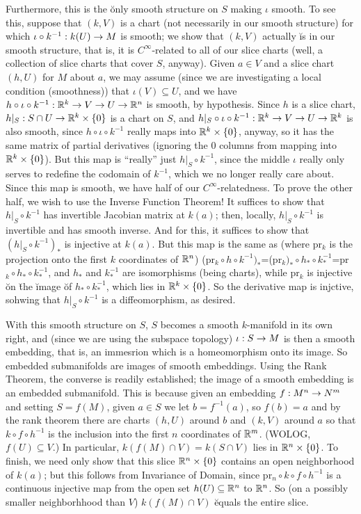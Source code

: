 Furthermore, this is the \u{only} smooth structure on $S$ making $\iota$ smooth. To see this, 
suppose that $(k,V)$ is a chart (not necessarily in our smooth structure) for which 
$\iota\circ k^{-1}: k(U)\rightarrow M$ is smooth; we show that $(k,V)$ actually \u{is} in our smooth
structure, that is, it is $C^\infty$-related to all of our slice charts (well, a collection of 
slice charts that cover $S$, anyway). Given $a\in V$ and 
a slice chart $(h,U)$ for $M$ about $a$, we may assume (since we are investigating a local condition (smoothness))
that $\iota(V)\subseteq U$, and we have 
$h\circ\iota\circ k^{-1}:{\Bbb R}^k\rightarrow V\rightarrow U\rightarrow {\Bbb R}^n$ is smooth, by hypothesis. Since $h$ is a slice chart,
$h|_S:S\cap U\rightarrow {\Bbb R}^k\times\{0\}$ is a chart on $S$, and $h|_S\circ\iota\circ k^{-1}:{\Bbb R}^k\rightarrow V\rightarrow U\rightarrow {\Bbb R}^k$
is also smooth, since $h\circ\iota\circ k^{-1}$ really maps into ${\Bbb R}^k\times\{0\}$, anyway, so it has the 
same matrix of partial derivatives (ignoring the $0$ columns from mapping into ${\Bbb R}^k\times\{0\}$).
But this map is ``really'' just $h|_S\circ k^{-1}$, since the middle $\iota$ really only serves to
redefine the codomain of $k^{-1}$, which we no longer really care about. Since this map is smooth,
we have half of our $C^\infty$-relatedness. To prove the other half, we wish to use the
Inverse Function Theorem! It suffices to show that $h|_S\circ k^{-1}$ has invertible Jacobian matrix
at $k(a)$; then, locally, $h|_S\circ k^{-1}$ is invertible and has smooth inverse. And for this, it suffices
to show that $(h|_S\circ k^{-1})_*$ is injective at $k(a)$. But this map is the same as
(where pr$_k$ is the projection onto the first $k$ coordinates of ${\Bbb R}^n$)
(pr$_{k}\circ h\circ k^{-1})_*$=(pr$_{k})_*\circ h_*\circ k^{-1}_*$=pr$_{k}\circ h_*\circ k^{-1}_*$,
and $h_*$ and $k^{-1}_*$ are isomorphisms (being charts), while pr$_{k}$ is injective \u{on} \u{the}
\u{image} \u{of} $h_*\circ k^{-1}_*$, which lies in ${\Bbb R}^k\times\{0\}$. So the derivative map is 
injctive, sohwing that $h|_S\circ k^{-1}$ is a diffeomorphism, as desired.

\msk

With this smooth structure on $S$, $S$ becomes a smooth $k$-manifold in its own right, and (since we are
using the subspace topology) $\iota:S\rightarrow M$ is then a smooth embedding, that is, an immesrion
which is a homeomorphism onto its image. So embedded submanifolds are images of smooth embeddings.
Using the Rank Theorem, the converse is readily established; the image of a smooth embedding is an
embedded submanifold. This is because given an embedding $f:M^n\rightarrow N^m$ and setting $S=f(M)$, given 
$a\in S$ we let $b=f^{-1}(a)$, so $f(b)=a$ and by the rank theorem there are charts $(h,U)$ around $b$
and $(k,V)$ around $a$ so that $k\circ f\circ h^{-1}$ is the inclusion into the first 
$n$ coordinates of ${\Bbb R}^m$. (WOLOG, $f(U)\subseteq V$.) In particular, 
$k(f(M)\cap V)=k(S\cap V)$ lies in ${\Bbb R}^n\times\{0\}$.
To finish, we need only show that this slice ${\Bbb R}^n\times\{0\}$ contains an open neighborhood of $k(a)$;
but this follows from Invariance of Domain, since  pr$_n\circ k\circ f\circ h^{-1}$ is a continuous
injective map from the open set $h(U)\subseteq{\Bbb R}^n$ to ${\Bbb R}^n$. So (on a possibly smaller
neighborhhood than $V$) $k(f(M)\cap V)$ \u{equals} the entire slice.

